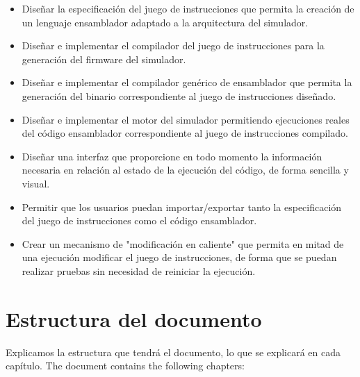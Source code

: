 \begin{itemize}

\item Diseñar la especificación del juego de instrucciones que permita la creación de un lenguaje ensamblador adaptado a la arquitectura del simulador.

\item Diseñar e implementar el compilador del juego de instrucciones para la generación del firmware del simulador.

\item Diseñar e implementar el compilador genérico de ensamblador que permita la generación del binario correspondiente al juego de instrucciones diseñado.

\item Diseñar e implementar el motor del simulador permitiendo ejecuciones reales del código ensamblador correspondiente al juego de instrucciones compilado.

\item Diseñar una interfaz que proporcione en todo momento la información necesaria en relación al estado de la ejecución del código, de forma sencilla y visual.

\item Permitir que los usuarios puedan importar/exportar tanto la especificación del juego de instrucciones como el código ensamblador.

\item Crear un mecanismo de "modificación en caliente" que permita en mitad de una ejecución modificar el juego de instrucciones, de forma que se puedan realizar pruebas sin necesidad de reiniciar la ejecución.

\end{itemize}

\section{Estructura del documento}
\label{sec:document_structure}

Explicamos la estructura que tendrá el documento, lo que se explicará en cada capítulo.
The document contains the following chapters:

